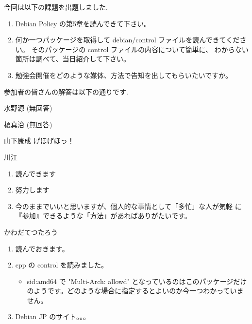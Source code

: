\documentclass[mingoth,a4paper]{jsarticle}
\begin{document}
今回は以下の課題を出題しました.
\begin{screen}
  \begin{enumerate}
  \item Debian Policy の第5章を読んできて下さい。
  \item 何か一つパッケージを取得して
    debian/control ファイルを読んできてください。
    そのパッケージの control ファイルの内容について簡単に、
    わからない箇所は調べて、当日紹介して下さい。
  \item 勉強会開催をどのような媒体、方法で告知を出してもらいたいですか。
  \end{enumerate}
\end{screen}

参加者の皆さんの解答は以下の通りです.

\begin{prework}{ 水野源 }
  (無回答)
\end{prework}

\begin{prework}{ 榎真治 }
  (無回答)
\end{prework}

\begin{prework}{ 山下康成 }
  げほげほっ！
\end{prework}

\begin{prework}{ 川江 }
  \begin{enumerate}
  \item 読んできます
  \item 努力します
  \item 今のままでいいと思いますが、個人的な事情として「多忙」な人が気軽
    に『参加』できるような「方法」があればありがたいです。
  \end{enumerate}
\end{prework}

\begin{prework}{ かわだてつたろう }
  \begin{enumerate}
  \item 読んでおきます。
  \item cpp の control を読みました。
    \begin{itemize}
    \item sid:amd64 で "Multi-Arch: allowd" となっているのはこのパッケージだけのようです。どのような場合に指定するとよいのか今一つわかっていません。
    \end{itemize}
  \item Debian JP のサイト。。。
  \end{enumerate}
\end{prework}
\end{document}

